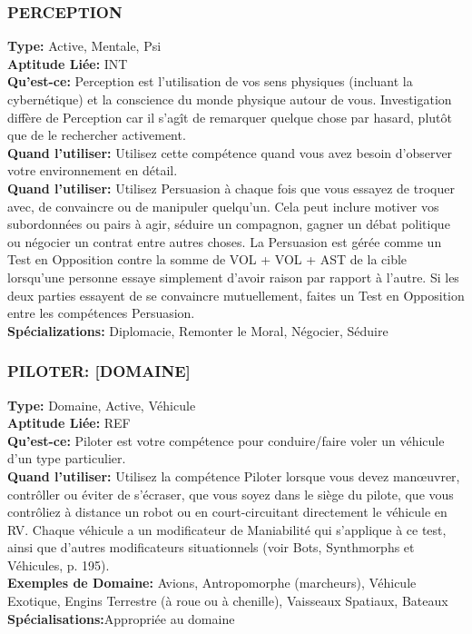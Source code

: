 \subsubsection{PERCEPTION} \textbf{Type:} Active, Mentale, Psi \\ \textbf{Aptitude Liée:} INT \\ \textbf{Qu'est-ce:} Perception est l'utilisation de vos sens physiques (incluant la cybernétique) et la conscience du monde physique autour de vous. Investigation diffère de Perception car il s'agît de remarquer quelque chose par hasard, plutôt que de le rechercher activement. \\ \textbf{Quand l'utiliser:} Utilisez cette compétence quand vous avez besoin d'observer votre environnement en détail. \\ \textbf{Quand l'utiliser:} Utilisez Persuasion à chaque fois que vous essayez de troquer avec, de convaincre ou de manipuler quelqu'un. Cela peut inclure motiver vos subordonnées ou pairs à agir, séduire un compagnon, gagner un débat politique ou négocier un contrat entre autres choses. La Persuasion est gérée comme un Test en Opposition contre la somme de VOL + VOL + AST de la cible lorsqu'une personne essaye simplement d'avoir raison par rapport à l'autre. Si les deux parties essayent de se convaincre mutuellement, faites un Test en Opposition entre les compétences Persuasion. \\ \textbf{Spécializations:} Diplomacie, Remonter le Moral, Négocier, Séduire 

\subsubsection{PILOTER: [DOMAINE]} \textbf{Type:} Domaine, Active, Véhicule\\ \textbf{Aptitude Liée:} REF \\ \textbf{Qu'est-ce:} Piloter est votre compétence pour conduire/faire voler un véhicule d'un type particulier. \\ \textbf{Quand l'utiliser:} Utilisez la compétence Piloter lorsque vous devez manœuvrer, contrôller ou éviter de s'écraser, que vous soyez dans le siège du pilote, que vous contrôliez à distance un robot ou en court-circuitant directement le véhicule en RV. Chaque véhicule a un modificateur de Maniabilité qui s'applique à ce test, ainsi que d'autres modificateurs situationnels (voir Bots, Synthmorphs et Véhicules, p. 195). \\ \textbf{Exemples de Domaine:} Avions, Antropomorphe (marcheurs), Véhicule Exotique, Engins Terrestre (à roue ou à chenille), Vaisseaux Spatiaux, Bateaux \\ \textbf{Spécialisations:}Appropriée au domaine 

